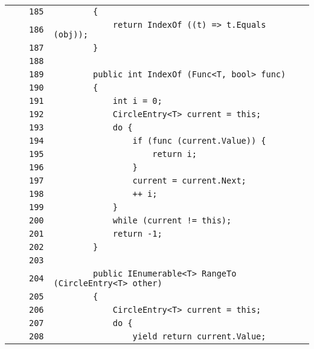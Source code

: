 \documentclass[a4paper,10pt]{article}
\begin{document}
\begin{longtable}[l]{lrrl}
\cellcolor{gray} &  & \verb~185~ & \verb~        {~\\
\cellcolor{gray} &  & \verb~186~ & \verb~            return IndexOf ((t) => t.Equals (obj));~\\
\cellcolor{gray} &  & \verb~187~ & \verb~        }~\\
\cellcolor{gray} &  & \verb~188~ & \verb~~\\
\cellcolor{gray} &  & \verb~189~ & \verb~        public int IndexOf (Func<T, bool> func)~\\
\cellcolor{gray} &  & \verb~190~ & \verb~        {~\\
\cellcolor{gray} &  & \verb~191~ & \verb~            int i = 0;~\\
\cellcolor{gray} &  & \verb~192~ & \verb~            CircleEntry<T> current = this;~\\
\cellcolor{gray} &  & \verb~193~ & \verb~            do {~\\
\cellcolor{gray} &  & \verb~194~ & \verb~                if (func (current.Value)) {~\\
\cellcolor{gray} &  & \verb~195~ & \verb~                    return i;~\\
\cellcolor{gray} &  & \verb~196~ & \verb~                }~\\
\cellcolor{gray} &  & \verb~197~ & \verb~                current = current.Next;~\\
\cellcolor{gray} &  & \verb~198~ & \verb~                ++ i;~\\
\cellcolor{gray} &  & \verb~199~ & \verb~            }~\\
\cellcolor{gray} &  & \verb~200~ & \verb~            while (current != this);~\\
\cellcolor{gray} &  & \verb~201~ & \verb~            return -1;~\\
\cellcolor{gray} &  & \verb~202~ & \verb~        }~\\
\cellcolor{gray} &  & \verb~203~ & \verb~~\\
\cellcolor{gray} &  & \verb~204~ & \verb~        public IEnumerable<T> RangeTo (CircleEntry<T> other)~\\
\cellcolor{gray} &  & \verb~205~ & \verb~        {~\\
\cellcolor{gray} &  & \verb~206~ & \verb~            CircleEntry<T> current = this;~\\
\cellcolor{gray} &  & \verb~207~ & \verb~            do {~\\
\cellcolor{gray} &  & \verb~208~ & \verb~                yield return current.Value;~\\

\end{longtable}
\end{document}
